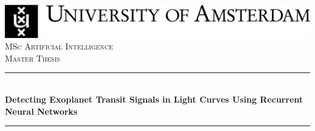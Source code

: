 \begin{titlepage}



\newcommand{\HRule}{\rule{\linewidth}{0.5mm}} %

\center %

 






\includegraphics[width=\linewidth]{Titlepage/UvA-logo/uvalogo_regular_p_en.jpg}\\[2.5cm]

\textsc{\Large MSc Artificial Intelligence}\\[0.2cm]

\textsc{\Large Master Thesis}\\[0.5cm] 








\HRule \\[0.4cm]

{ \huge \bfseries Detecting Exoplanet Transit Signals in Light Curves Using Recurrent Neural Networks}\\[0.4cm] %

\HRule \\[0.5cm]

 







\end{titlepage}

